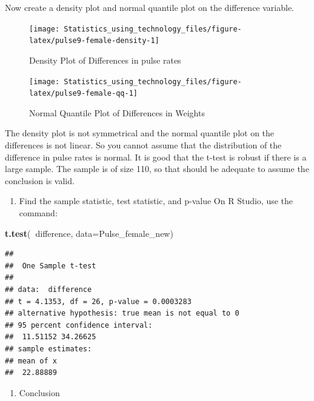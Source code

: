 \documentclass[
]{book}
\newenvironment{Shaded}{\begin{snugshade}}{\end{snugshade}}
\newcommand{\DataTypeTok}[1]{\textcolor[rgb]{0.13,0.29,0.53}{#1}}
\newcommand{\KeywordTok}[1]{\textcolor[rgb]{0.13,0.29,0.53}{\textbf{#1}}}
\newcommand{\NormalTok}[1]{#1}
\newcommand{\OperatorTok}[1]{\textcolor[rgb]{0.81,0.36,0.00}{\textbf{#1}}}
\providecommand{\tightlist}{%
  \setlength{\itemsep}{0pt}\setlength{\parskip}{0pt}}
\begin{document}
Now create a density plot and normal quantile plot on the difference variable.



\begin{figure}
\texttt{[image: Statistics\_using\_technology\_files/figure-latex/pulse9-female-density-1]} \caption{Density Plot of Differences in pulse rates}\label{fig:pulse9-female-density}
\end{figure}



\begin{figure}
\texttt{[image: Statistics\_using\_technology\_files/figure-latex/pulse9-female-qq-1]} \caption{Normal Quantile Plot of Differences in Weights}\label{fig:pulse9-female-qq}
\end{figure}

The density plot is not symmetrical and the normal quantile plot on the differences is not linear.
So you cannot assume that the distribution of the difference in pulse rates is normal. It is good that the t-test is robust if there is a large sample. The sample is of size 110, so that should be adequate to assume the conclusion is valid.

\begin{enumerate}
\def\labelenumi{\arabic{enumi}.}
\setcounter{enumi}{3}
\tightlist
\item
  Find the sample statistic, test statistic, and p-value
  On R Studio, use the command:
\end{enumerate}

\begin{Shaded}
\begin{Highlighting}[]
\KeywordTok{t.test}\NormalTok{(}\OperatorTok{~}\NormalTok{difference, }\DataTypeTok{data=}\NormalTok{Pulse_female_new)}
\end{Highlighting}
\end{Shaded}

\begin{verbatim}
## 
##  One Sample t-test
## 
## data:  difference
## t = 4.1353, df = 26, p-value = 0.0003283
## alternative hypothesis: true mean is not equal to 0
## 95 percent confidence interval:
##  11.51152 34.26625
## sample estimates:
## mean of x 
##  22.88889
\end{verbatim}

\begin{enumerate}
\def\labelenumi{\arabic{enumi}.}
\setcounter{enumi}{4}
\tightlist
\item
  Conclusion
\end{enumerate}
\end{document}
